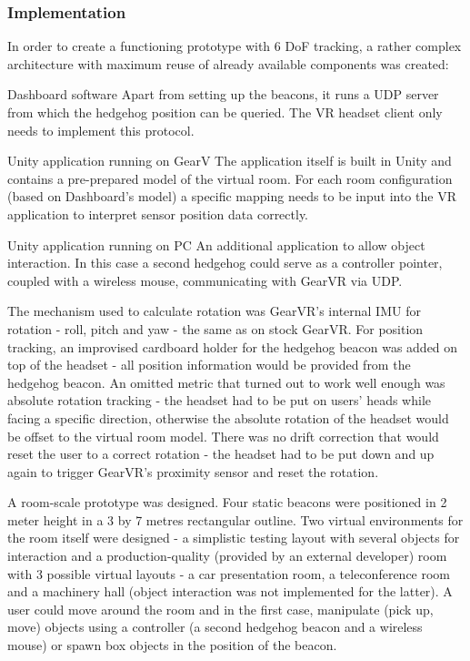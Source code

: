 \documentclass[12pt, a4paper]{article}
\newenvironment{definitions}
{\begin{description}[style=nextline]}
{\end{description}}
\begin{document}
\subsubsection{Implementation}
In order to create a functioning prototype with 6 DoF tracking, a rather complex architecture with maximum reuse of already available components was created:

\begin{definitions}
\item[Dashboard software] Apart from setting up the beacons, it runs a UDP server from which the hedgehog position can be queried. The VR headset client only needs to implement this protocol.
\item[Unity application running on GearV] The application itself is built in Unity and contains a pre-prepared model of the virtual room. For each room configuration (based on Dashboard’s model) a specific mapping needs to be input into the VR application to interpret sensor position data correctly.
\item[Unity application running on PC] An additional application to allow object interaction. In this case a second hedgehog could serve as a controller pointer, coupled with a wireless mouse, communicating with GearVR via UDP.
\end{definitions}

The mechanism used to calculate rotation was GearVR’s internal IMU for rotation - roll, pitch and yaw - the same as on stock GearVR. For position tracking, an improvised cardboard holder for the hedgehog beacon was added on top of the headset - all position information would be provided from the hedgehog beacon. An omitted metric that turned out to work well enough was absolute rotation tracking - the headset had to be put on users’ heads while facing a specific direction, otherwise the absolute rotation of the headset would be offset to the virtual room model. There was no drift correction that would reset the user to a correct rotation - the headset had to be put down and up again to trigger GearVR’s proximity sensor and reset the rotation.

A room-scale prototype was designed. Four static beacons were positioned in 2 meter height in a 3 by 7 metres rectangular outline. Two virtual environments for the room itself were designed - a simplistic testing layout with several objects for interaction and a production-quality (provided by an external developer) room with 3 possible virtual layouts - a car presentation room, a teleconference room and a machinery hall (object interaction was not implemented for the latter). A user could move around the room and in the first case, manipulate (pick up, move) objects using a controller (a second hedgehog beacon and a wireless mouse) or spawn box objects in the position of the beacon.
\end{document}
